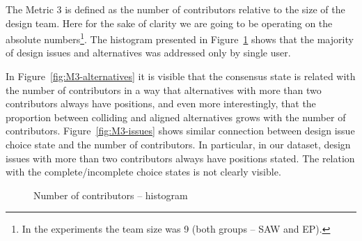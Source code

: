 \documentclass[article]{elsarticle}
\begin{document}
The Metric 3 is defined as the number of contributors relative to the size of the design team. Here for the sake of clarity we are going to be operating on the absolute numbers\footnote{In the experiments the team size was 9 (both groups -- SAW and EP).}. The histogram presented in Figure~\ref{fig:M3-histogram} shows that the majority of design issues and alternatives was addressed only by single user. 

In Figure~\ref{fig:M3-alternatives} it is visible that the consensus state is related with the number of contributors in a way that alternatives with more than two contributors always have positions, and even more interestingly, that the proportion between colliding and aligned alternatives grows with the number of contributors. Figure~\ref{fig:M3-issues} shows similar connection between design issue choice state and the number of contributors. In particular, in our dataset, design issues with more than two contributors always have positions stated. The relation with the complete/incomplete choice states is not clearly visible. 
\begin{figure}
  \begin{center}  
  \caption{Number of contributors -- histogram}
  \label{fig:M3-histogram}
  \end{center}
\end{figure}
\end{document}
